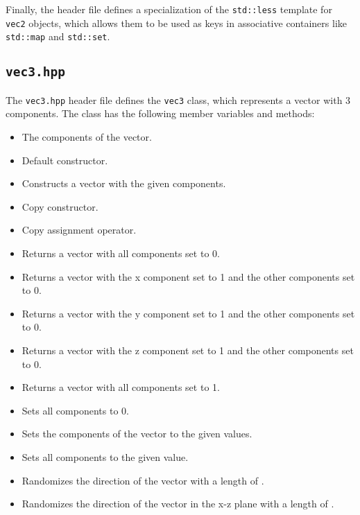 \documentclass[a4paper,onecolumn,11pt]{doofus}
\begin{document}
Finally, the header file defines a specialization of the \texttt{std::less} template for \texttt{vec2} objects, which allows them to be used as keys in associative containers like \texttt{std::map} and \texttt{std::set}.

\subsection{\texttt{vec3.hpp}}

The \texttt{vec3.hpp} header file defines the \texttt{vec3} class, which represents a vector with 3 components. The class has the following member variables and methods:

\begin{itemize}
\item {} The components of the vector.
\item {} Default constructor.
\item {} Constructs a vector with the given components.
\item {} Copy constructor.
\item {} Copy assignment operator.
\item {} Returns a vector with all components set to 0.
\item {} Returns a vector with the x component set to 1 and the other components set to 0.
\item {} Returns a vector with the y component set to 1 and the other components set to 0.
\item {} Returns a vector with the z component set to 1 and the other components set to 0.
\item {} Returns a vector with all components set to 1.
\item {} Sets all components to 0.
\item {} Sets the components of the vector to the given values.
\item {} Sets all components to the given value.
\item {} Randomizes the direction of the vector with a length of .
\item {} Randomizes the direction of the vector in the x-z plane with a length of .

\end{itemize}
\end{document}
